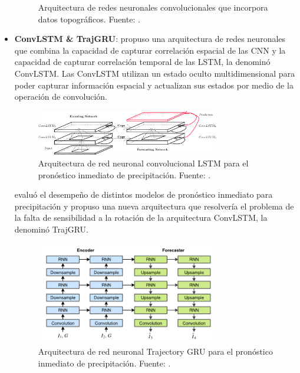 \begin{itemize}
\begin{figure}[H]
    \caption{
      Arquitectura de redes neuronales convolucionales que incorpora datos 
      topográficos. Fuente: \cite{Chang2018}.
    }
    \label{fig:chang}
  \end{figure}

  \item \textbf{ConvLSTM \& TrajGRU}: \cite{DBLP:journals/corr/ShiCWYWW15} 
  propuso una arquitectura de redes neuronales que combina la capacidad de 
  capturar correlación espacial de las CNN y la capacidad de capturar 
  correlación temporal de las LSTM, la denominó ConvLSTM. Las ConvLSTM utilizan 
  un estado oculto multidimensional para poder capturar información espacial y 
  actualizan sus estados por medio de la operación de convolución. 
  \begin{figure}[H]
    \centering
    \includegraphics[width=8cm]{E_IMAGENES/3_EstadoArte/convlstm}
    \caption{
      Arquitectura de red neuronal convolucional LSTM para el pronóstico 
      inmediato de precipitación. Fuente: \cite{DBLP:journals/corr/ShiCWYWW15}.
    }
    \label{fig:convlstm}
  \end{figure}
  \cite{DBLP:journals/corr/ShiGL0YWW17} evaluó el desempeño de distintos 
  modelos de pronóstico inmediato para precipitación y propuso una nueva 
  arquitectura que resolvería el problema de la falta de sensibilidad a la 
  rotación de la arquitectura ConvLSTM, la denominó TrajGRU.
  \begin{figure}[H]
    \centering
    \includegraphics[width=8cm]{E_IMAGENES/3_EstadoArte/trajgru}
    \caption{
      Arquitectura de red neuronal Trajectory GRU para el pronóstico 
      inmediato de precipitación. Fuente: \cite{DBLP:journals/corr/ShiGL0YWW17}.
    }
    \label{fig:trajgru}
  \end{figure}


\end{itemize}
